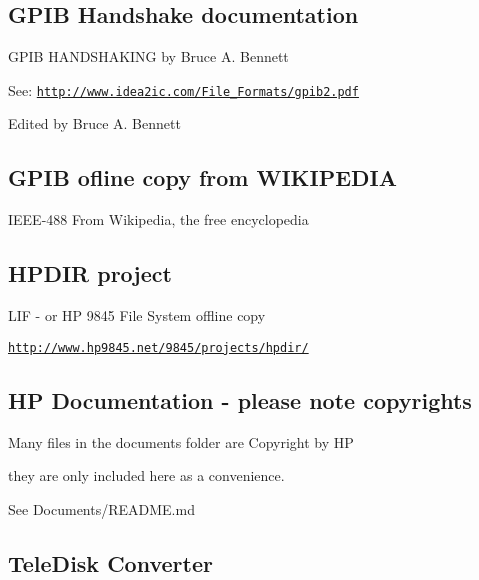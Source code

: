 \subsection*{G\+P\+IB Handshake documentation}


\begin{DoxyItemize}
\item G\+P\+IB H\+A\+N\+D\+S\+H\+A\+K\+I\+NG by Bruce A. Bennett
\begin{DoxyItemize}
\item See\+: \href{http://www.idea2ic.com/File_Formats/gpib2.pdf}{\tt http\+://www.\+idea2ic.\+com/\+File\+\_\+\+Formats/gpib2.\+pdf}
\begin{DoxyItemize}
\item Edited by Bruce A. Bennett 


\end{DoxyItemize}
\end{DoxyItemize}
\end{DoxyItemize}

\subsection*{G\+P\+IB ofline copy from W\+I\+K\+I\+P\+E\+D\+IA}


\begin{DoxyItemize}
\item I\+E\+E\+E-\/488 From Wikipedia, the free encyclopedia 

 \subsection*{H\+P\+D\+IR project}
\end{DoxyItemize}


\begin{DoxyItemize}
\item L\+IF -\/ or HP 9845 File System offline copy
\begin{DoxyItemize}
\item \href{http://www.hp9845.net/9845/projects/hpdir/}{\tt http\+://www.\+hp9845.\+net/9845/projects/hpdir/} 

 \subsection*{HP Documentation -\/ please note copyrights}
\end{DoxyItemize}
\item Many files in the documents folder are Copyright by HP
\begin{DoxyItemize}
\item they are only included here as a convenience.
\end{DoxyItemize}
\item See Documents/\+R\+E\+A\+D\+M\+E.\+md 

 \subsection*{Tele\+Disk Converter}
\end{DoxyItemize}


